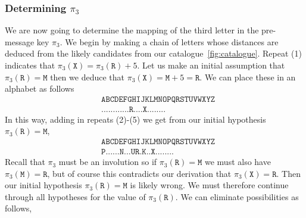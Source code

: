 \subsubsection{Determining $\pi_3$}
We are now going to determine the mapping of the third letter in
the pre-message key $\pi_3$. We begin by making a chain of
letters whose distances are deduced from the likely candidates from
our catalogue~\ref{fig:catalogue}. Repeat (1) indicates that
$\pi_3(\texttt{X}) = \pi_3(\texttt{R}) + 5$. Let us make an
initial assumption that $\pi_3(\texttt{R}) = \texttt{M}$ then we
deduce that $\pi_3(\texttt{X}) = \texttt{M} + 5 = \texttt{R}$.
We can place these in an alphabet as follows
\begin{align*}
  & \texttt{ABCDEFGHIJKLMNOPQRSTUVWXYZ} \\
  & \texttt{............R....X........}
\end{align*}
In this way, adding in repeats (2)-(5) we get from our initial
hypothesis $\pi_3(\texttt{R}) = \texttt{M}$,
\begin{align*}
  & \texttt{ABCDEFGHIJKLMNOPQRSTUVWXYZ} \\
  & \texttt{P......N...UR.K..X........}
\end{align*}
Recall that $\pi_3$ must be an involution so if
$\pi_3(\texttt{R}) = \texttt{M}$ we must also have
$\pi_3(\texttt{M}) = \texttt{R}$, but of course this contradicts
our derivation that $\pi_3(\texttt{X}) = \texttt{R}$. Then our
initial hypothesis $\pi_3(\texttt{R}) = \texttt{M}$ is likely
wrong. We must therefore continue through all hypotheses for the
value of $\pi_3(\texttt{R})$. We can eliminate possibilities as follows,
